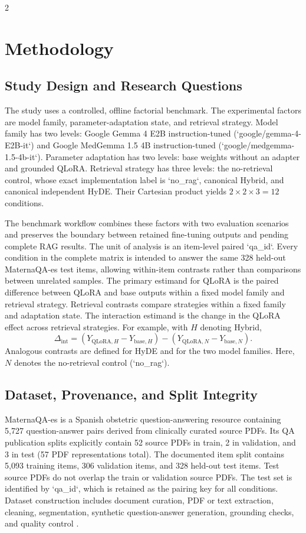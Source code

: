 \documentclass[11pt]{article}
\begin{document}
\begin{multicols}{2}
\raggedright
\section{Methodology}

\subsection{Study Design and Research Questions}

The study uses a controlled, offline factorial benchmark. The experimental factors are model family, parameter-adaptation state, and retrieval strategy. Model family has two levels: Google Gemma 4 E2B instruction-tuned (`google/gemma-4-E2B-it`) and Google MedGemma 1.5 4B instruction-tuned (`google/medgemma-1.5-4b-it`). Parameter adaptation has two levels: base weights without an adapter and grounded QLoRA. Retrieval strategy has three levels: the no-retrieval control, whose exact implementation label is `no\_rag`, canonical Hybrid, and canonical independent HyDE. Their Cartesian product yields $2 \times 2 \times 3 = 12$ conditions.

The benchmark workflow combines these factors with two evaluation scenarios and preserves the boundary between retained fine-tuning outputs and pending complete RAG results. The unit of analysis is an item-level paired `qa\_id`. Every condition in the complete matrix is intended to answer the same 328 held-out MaternaQA-es test items, allowing within-item contrasts rather than comparisons between unrelated samples. The primary estimand for QLoRA is the paired difference between QLoRA and base outputs within a fixed model family and retrieval strategy. Retrieval contrasts compare strategies within a fixed family and adaptation state. The interaction estimand is the change in the QLoRA effect across retrieval strategies. For example, with $H$ denoting Hybrid,
\[
  \Delta_{\mathrm{int}} =
  (Y_{\mathrm{QLoRA},H}-Y_{\mathrm{base},H})
  -(Y_{\mathrm{QLoRA},N}-Y_{\mathrm{base},N}).
\]
Analogous contrasts are defined for HyDE and for the two model families. Here, $N$ denotes the no-retrieval control (`no\_rag`).

\subsection{Dataset, Provenance, and Split Integrity}

MaternaQA-es is a Spanish obstetric question-answering resource containing 5,727 question-answer pairs derived from clinically curated source PDFs. Its QA publication splits explicitly contain 52 source PDFs in train, 2 in validation, and 3 in test (57 PDF representations total). The documented item split contains 5,093 training items, 306 validation items, and 328 held-out test items. Test source PDFs do not overlap the train or validation source PDFs. The test set is identified by `qa\_id`, which is retained as the pairing key for all conditions. Dataset construction includes document curation, PDF or text extraction, cleaning, segmentation, synthetic question-answer generation, grounding checks, and quality control \cite{MaternaQAes2025}.


\end{multicols}
\end{document}
